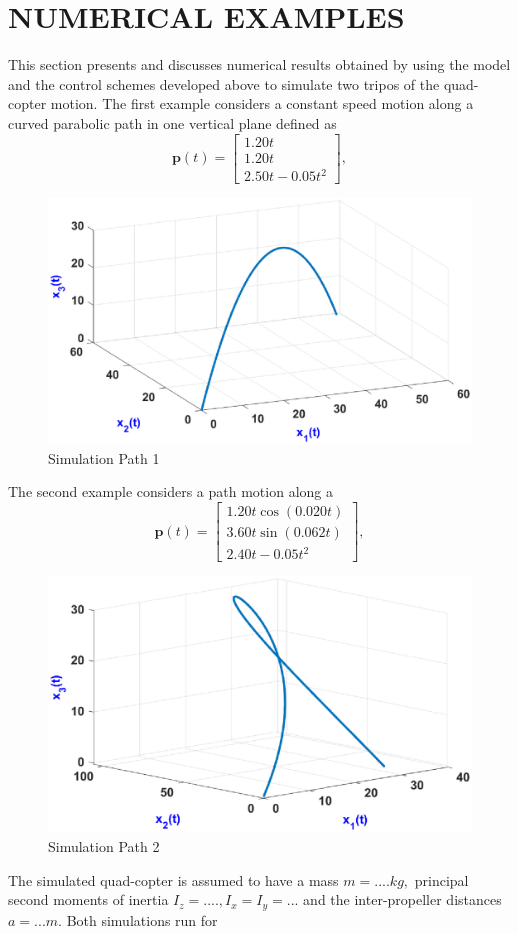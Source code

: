 \documentclass[twocolumn,10pt]{asme2e}
\begin{document}
{\section{NUMERICAL EXAMPLES}
\color{purple}
This section presents and discusses numerical results obtained by using the model and the control schemes developed above to simulate two tripos of the quad-copter motion. The first example considers a constant speed motion along a curved parabolic path in one vertical plane defined as
\begin{equation}\textbf{p}(t)=\left[\begin{array}{c}
	1.20t\\
	1.20t\\
	2.50t-0.05t^2
\end{array}\right],\end{equation}
\begin{figure}[h]
	\includegraphics[scale=0.5]{path1}
	\caption{Simulation Path 1}
\end{figure}
The second example considers a path motion along a
\begin{equation}\textbf{p}(t)=\left[\begin{array}{c}
		1.20t\cos(0.020t)\\
		3.60t\sin(0.062t)\\
		2.40t-0.05t^2
	\end{array}\right],\end{equation}
\begin{figure}[h]
	\includegraphics[scale=0.5]{path2}
	\caption{Simulation Path 2}
\end{figure}
The simulated quad-copter is assumed to have a mass $m= .... kg,$ principal second moments of inertia $I_z=...., I_x=I_y=...$ and the inter-propeller distances $a=...m$. Both simulations run for 


}
\end{document}

